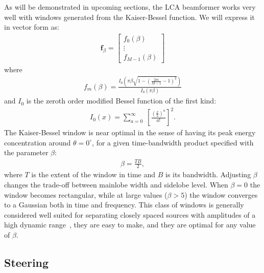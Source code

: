 \documentclass[10pt,journal,draftclsnofoot,onecolumn]{IEEEtran}
\newcommand\bmat[1]{\begin{bmatrix}#1\end{bmatrix}}
\newcommand\sumb[2]{\sum\limits_{#1}^{#2}\;}
\renewcommand\vec[1]{\boldsymbol{#1}}
\newcommand\1{\vec 1}
\newcommand*\f{\vec f}
\begin{document}
As will be demonstrated in upcoming sections, the LCA beamformer works very well with windows generated from the Kaiser-Bessel function. We will express it in vector form as:
%
\begin{align}
\f_\beta = \bmat{
f_0(\beta) \\
\vdots\\
f_{M-1}(\beta)
}\label{eq:kaiser_window_vector}
\end{align}
%
where
%
\begin{align}
f_m(\beta) = \frac{I_0\left(\pi\beta\sqrt{1-\left(\frac{2m}{M-1}-1\right)^2}\right)}{I_0(\pi\beta)}\label{eq:kaiser_window_element}
\end{align}
%
and $I_0$ is the zeroth order modified Bessel function of the first kind:
%
\begin{align}
I_0(x) = \sumb{a=0}{\infty} \left[ \frac{\left(\frac{x}{2}\right)^a}{a!} \right]^2.\label{eq:modified_bessel_first_kind}
\end{align}
%
The Kaiser-Bessel window is near optimal in the sense of having its peak energy concentration around $\theta=0^\circ$, for a given time-bandwidth product specified with the parameter $\beta$:
%
\begin{align}
\beta = \frac{TB}{2},
\end{align}
%
where $T$ is the extent of the window in time and $B$ is its bandwidth. Adjusting $\beta$ changes the trade-off between mainlobe width and sidelobe level. When $\beta=0$ the window becomes rectangular, while at large values ($\beta>5$) the window converges to a Gaussian both in time and frequency. This class of windows is generally considered well suited for separating closely spaced sources with amplitudes of a high dynamic range~\cite{Harris1978}, they are easy to make, and they are optimal for any value of $\beta$.


\subsection{Steering}\label{sec:lca_steering}
\end{document}
